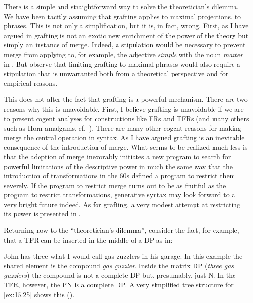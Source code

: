 \documentclass[output=paper]{langsci/langscibook}
\begin{document}
\begin{refcontext}
There is a simple and straightforward way to solve the theoretician’s dilemma.
We have been tacitly assuming that grafting applies to maximal projections, to
phrases. This is not only a simplification, but it is, in fact, wrong. First,
as I have argued in \citet{VanRiemsdijk2006b} grafting is not an exotic new
enrichment of the power of the theory but simply an instance of merge. Indeed,
a stipulation would be necessary to prevent merge from applying to, for
example, the adjective \emph{simple} with the noun \emph{matter} in .
But observe that limiting grafting to maximal phrases would also require a
stipulation that is unwarranted both from a theoretical perspective and for
empirical reasons.

This does not alter the fact that grafting is a powerful mechanism.  There are
two reasons why this is unavoidable. First, I believe grafting is unavoidable
if we are to present cogent analyses for constructions like \glspl{FR} and
\glspl{TFR} (and many others such as Horn-amalgams, cf.\
\cite{VanRiemsdijk2006c}). There are many other cogent reasons for making
merge the central operation in syntax. As I have argued \parencite{VanRiemsdijk2006b}
grafting is an inevitable consequence of the introduction of merge.  What seems
to be realized much less is that the adoption of merge inexorably initiates a
new program to search for powerful limitations of the descriptive power in much
the same way that the introduction of transformations in the 60s defined a
program to restrict them severely. If the program to restrict merge turns out
to be as fruitful as the program to restrict transformations, generative syntax
may look forward to a very bright future indeed. As for grafting, a very modest
attempt at restricting its power is presented in \citet{VanRiemsdijk2010}.

Returning now to the \enquote{theoretician’s dilemma}, consider the fact, for
example, that a \gls{TFR} can be inserted in the middle of a DP as in:

\ea\label{ex:15.25}
    John has three what I would call gas guzzlers in his garage.
\z
In this example the shared element is the compound \emph{gas guzzler}.  Inside
the matrix DP (\emph{three gas guzzlers}) the compound is not a complete DP
but, presumably, just N. In the \gls{TFR}, however, the \gls{PN} is a complete
DP\@. A very simplified tree structure for \eqref{ex:15.25} shows this ().


\end{refcontext}
\end{document}
